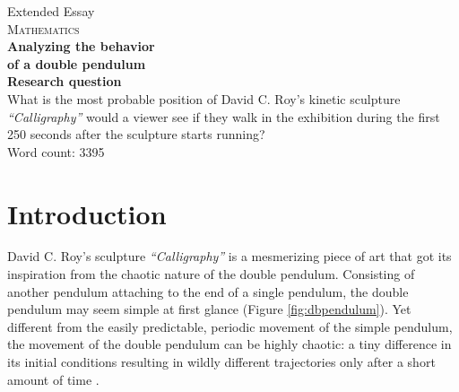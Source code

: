 \documentclass[a4paper,12pt]{article}
\begin{document}
\setlength{\parskip}{1.6em}
\setlength{\parindent}{0cm}

\begin{titlepage}
    \begin{center}
        Extended Essay\\
        \textsc{Mathematics}\\
    \vspace*{4cm}
    \textbf{\huge{Analyzing the behavior}}\\[5mm]
    \textbf{\huge{of a double pendulum}}\\
    \vspace{1cm}
    \textbf{Research question}\\ [2mm]
        What is the most probable position of David C. Roy’s kinetic 
        sculpture \textit{“Calligraphy”} would a viewer see if they walk in the 
        exhibition during the first 250 seconds after the sculpture starts 
        running?\\  
    \vspace{4cm}
        Word count: 3395
    \vfill
    \end{center}
\end{titlepage}

\tableofcontents\pagebreak

\section{Introduction}
    David C. Roy’s sculpture \textit{“Calligraphy”} is a mesmerizing piece of art that got its inspiration from the chaotic nature of the double pendulum. Consisting of another pendulum attaching to the end of a single pendulum, the double pendulum may seem simple at first glance (Figure \ref{fig:dbpendulum}). Yet different from the easily predictable, periodic movement of the simple pendulum, the movement of the double pendulum can be highly chaotic: a tiny difference in its initial conditions resulting in wildly different trajectories only after a short amount of time \cite{shinbrot}.
        
\end{document}
